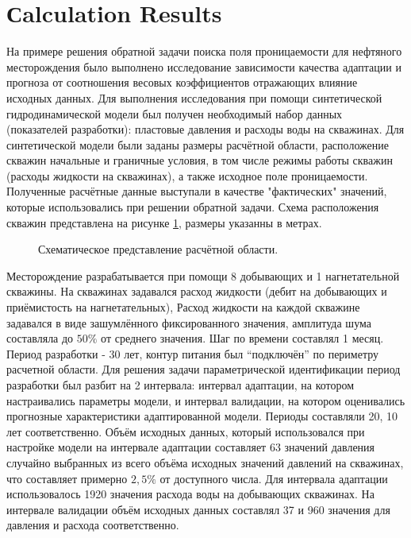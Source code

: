 \documentclass{article}
\begin{document}
\section{Сalculation Results}
На примере решения обратной задачи поиска поля проницаемости для нефтяного месторождения было выполнено исследование зависимости качества адаптации и прогноза от соотношения весовых коэффициентов отражающих влияние исходных данных. Для выполнения исследования при помощи синтетической гидродинамической модели был получен необходимый набор данных (показателей разработки): пластовые давления и расходы воды на скважинах. Для синтетической модели были заданы размеры расчётной области, расположение скважин начальные и граничные условия, в том числе режимы работы скважин (расходы жидкости на скважинах), а также исходное поле проницаемости. Полученные расчётные данные выступали в качестве "фактических" значений, которые использовались при решении обратной задачи. Схема расположения скважин представлена на рисунке \ref{fig:map}, размеры указанны в метрах. 
\begin{figure}
    \caption{Схематическое представление расчётной области.}
	\label{fig:map}
\end{figure}

Месторождение разрабатывается при помощи 8 добывающих и 1 нагнетательной скважины. На скважинах задавался расход жидкости (дебит на добывающих и приёмистость на нагнетательных), Расход жидкости на каждой скважине задавался в виде зашумлённого фиксированного значения, амплитуда шума составляла до $50\%$ от среднего значения. Шаг по времени составлял 1 месяц. Период разработки - 30 лет, контур питания был “подключён” по периметру расчетной области. Для решения задачи параметрической идентификации период разработки был разбит на 2 интервала: интервал адаптации, на котором настраивались параметры модели, и интервал валидации, на котором оценивались прогнозные характеристики адаптированной модели. Периоды составляли 20, 10 лет соответственно. Объём исходных данных, который использовался при настройке модели на интервале адаптации составляет 63 значений давления случайно выбранных из всего объёма исходных значений давлений на скважинах, что составляет примерно $2,5\%$ от доступного числа. Для интервала адаптации использовалось 1920 значения расхода воды на добывающих скважинах. На интервале валидации объём исходных данных составлял 37 и 960 значения для давления и расхода соответственно. 
\end{document}
